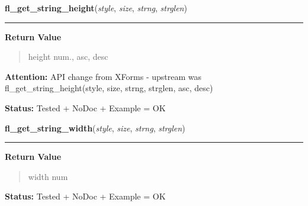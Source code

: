     \label{xformslib:library:fl_get_string_height}

    \vspace{0.5ex}

\hspace{.8\funcindent}\begin{boxedminipage}{\funcwidth}

    \raggedright \textbf{fl\_get\_string\_height}(\textit{style}, \textit{size}, \textit{strng}, \textit{strglen})

    \vspace{-1.5ex}

    \rule{\textwidth}{0.5\fboxrule}
\setlength{\parskip}{2ex}
\setlength{\parskip}{1ex}
      \textbf{Return Value}
    \vspace{-1ex}

      \begin{quote}
      height num., asc, desc

      \end{quote}

\textbf{Attention:} API change from XForms - upstream was fl\_get\_string\_height(style, size, 
strng, strglen, asc, desc)



\textbf{Status:} Tested + NoDoc + Example = OK



    \end{boxedminipage}

    \label{xformslib:library:fl_get_string_width}

    \vspace{0.5ex}

\hspace{.8\funcindent}\begin{boxedminipage}{\funcwidth}

    \raggedright \textbf{fl\_get\_string\_width}(\textit{style}, \textit{size}, \textit{strng}, \textit{strglen})

    \vspace{-1.5ex}

    \rule{\textwidth}{0.5\fboxrule}
\setlength{\parskip}{2ex}
\setlength{\parskip}{1ex}
      \textbf{Return Value}
    \vspace{-1ex}

      \begin{quote}
      width num

      \end{quote}

\textbf{Status:} Tested + NoDoc + Example = OK



    \end{boxedminipage}

